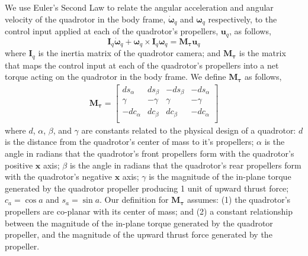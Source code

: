 We use Euler's Second Law to relate the angular acceleration and angular velocity of the quadrotor in the body frame, $\dot{\mathbf{\omega}}_q$ and $\mathbf{\omega}_q$ respectively, to the control input applied at each of the quadrotor's propellers, $\mathbf{u}_q$, as follows,
%
\begin{equation}
\mathbf{I}_{q} \dot{\mathbf{\omega}}_q + \mathbf{\omega}_q \times \mathbf{I}_q \mathbf{\omega}_q = \mathbf{M}_{\mathbf{\tau}} \mathbf{u}_q
\end{equation}
%
where $\mathbf{I}_{q}$ is the inertia matrix of the quadrotor camera; and $\mathbf{M}_{\mathbf{\tau}}$ is the matrix that maps the control input at each of the quadrotor's propellers into a net torque acting on the quadrotor in the body frame.
We define $\mathbf{M}_{\mathbf{\tau}}$ as follows, 
%
\footnotesize
\begin{equation}
\begin{aligned}
%
\mathbf{M}_{\mathbf{\tau}} =
\begin{bmatrix}
 ds_\alpha & ds_\beta & -ds_\beta & -ds_\alpha \\
\gamma     & -\gamma  & \gamma    & -\gamma    \\
-dc_\alpha & dc_\beta & dc_\beta  & -dc_\alpha \\
\end{bmatrix}
%
\end{aligned}
\end{equation}
\normalsize
%
where $d$, $\alpha$, $\beta$, and $\gamma$ are constants related to the physical design of a quadrotor:
$d$ is the distance from the quadrotor's center of mass to it's propellers;
$\alpha$ is the angle in radians that the quadrotor's front propellers form with the quadrotor's positive $\mathbf{x}$ axis;
$\beta$ is the angle in radians that the quadrotor's rear propellers form with the quadrotor's negative $\mathbf{x}$ axis;
$\gamma$ is the magnitude of the in-plane torque generated by the quadrotor propeller producing 1 unit of upward thrust force;
$c_a=\cos a$ and $s_a=\sin a$.
Our definition for $\mathbf{M}_{\mathbf{\tau}}$ assumes: (1) the quadrotor's propellers are co-planar with its center of mass; and (2) a constant relationship between the magnitude of the in-plane torque generated by the quadrotor propeller, and the magnitude of the upward thrust force generated by the propeller. 

